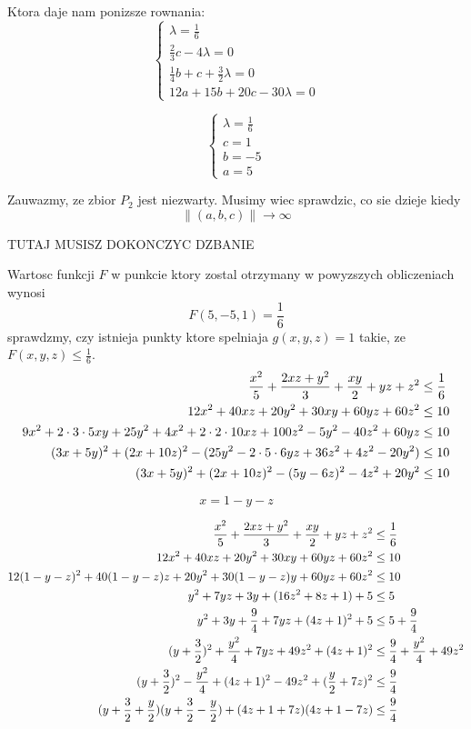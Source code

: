 \documentclass{article}[13pt]
\begin{document}
    Ktora daje nam ponizsze rownania:
    $$
        \begin{cases}
            \lambda=\frac16\\
            \frac23 c-4\lambda=0\\
            \frac14b+c+\frac32\lambda=0\\
            12a+15b+20c-30\lambda=0
        \end{cases}
    $$

    $$
        \begin{cases}
            \lambda=\frac16\\
            c=1\\
            b=-5\\
            a=5
        \end{cases}
    $$

    Zauwazmy, ze zbior $P_2$ jest niezwarty. Musimy wiec sprawdzic, co sie dzieje kiedy
    $$\|(a,b,c)\|\to\infty$$

    {\color{cyan}TUTAJ MUSISZ DOKONCZYC DZBANIE}

    Wartosc funkcji $F$ w punkcie ktory zostal otrzymany w powyzszych obliczeniach wynosi
    $$F(5,-5,1)=\frac16$$
    sprawdzmy, czy istnieja punkty ktore spelniaja $g(x,y,z)=1$ takie, ze $F(x,y,z)\leq\frac16$.
    \begin{align*}
        {x^2\over5}+{2xz+y^2\over3}+{xy\over2}+yz+z^2&\leq\frac16\\
        12x^2+40xz+20y^2+30xy+60yz+60z^2&\leq10\\
        9x^2+2\cdot3\cdot5xy+25y^2  +4x^2+2\cdot2\cdot10xz+100z^2  -5y^2-40z^2+60yz&\leq10\\
        (3x+5y)^2+(2x+10z)^2-(25y^2-2\cdot5\cdot6yz+36z^2 + 4z^2-20y^2)&\leq10\\
        (3x+5y)^2+(2x+10z)^2-(5y-6z)^2-4z^2+20y^2&\leq10
    \end{align*}

    $$x=1-y-z$$
    
    \begin{align*}
        {x^2\over5}+{2xz+y^2\over3}+{xy\over2}+yz+z^2&\leq\frac16\\
        12x^2+40xz+20y^2+30xy+60yz+60z^2&\leq10\\
        12(1-y-z)^2+40(1-y-z)z+20y^2+30(1-y-z)y+60yz+60z^2&\leq10\\
        y^2+7yz+3y+(16z^2+8z+1)+5&\leq5\\
        y^2+3y+\frac94+7yz+(4z+1)^2+5&\leq5+\frac94\\
        (y+\frac32)^2+{y^2\over4}+7yz+49z^2+(4z+1)^2&\leq\frac94+{y^2\over4}+49z^2\\
        (y+\frac32)^2-{y^2\over4}+(4z+1)^2-49z^2+(\frac y2+7z)^2&\leq\frac94\\
        (y+\frac32+\frac y2)(y+\frac32-\frac y2)+(4z+1+7z)(4z+1-7z)&\leq \frac94
    \end{align*}
\end{document}
